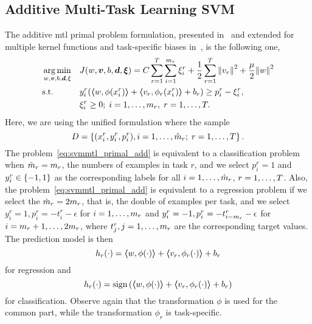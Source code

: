 \subsection{Additive Multi-Task Learning SVM}
The {additive} \acrshort{mtl} primal problem formulation, presented in~\cite{EvgeniouP04} 
and extended for multiple kernel functions and task-specific biases in~\cite{CaiC12}, is the following one,
\begin{equation}\label{eq:svmmtl_primal_add}
    \begin{aligned}
    & \argmin_{w, \fv{v}, b, \fv{d}, \xi}
    & & {J({w}, \fv{v}, b, \fv{d}, \fv{\xi}) = C \sum_{r= 1}^T \sum_{i=1}^{m_r} {\xi_{i}^r} + \frac{1}{2} \sum_{r= 1}^T{\norm{{v}_r}^2} + \frac{\mu}{2} {\norm{{w}}}^2} \\
    & \text{s.t.}
    & & y_{i}^r (\dotp{w}{\phi(x_{i}^r)} + \dotp{v_r}{\phi_r(x_{i}^r)} + b_r) \geq p_{i}^r - \xi_{i}^r ,  \\
    & & & \xi_{i}^r \geq 0; \;  i=1 , \dotsc , m_r, \;  r= 1,\dotsc, T  . \\
    \end{aligned}
\end{equation}
Here, we are using the unified formulation where the sample 
$$D = \left\{(x_i^r, y_i^r, p_i^r), i=1, \ldots, \hat{m}_r; \; r=1, \ldots, T\right\}. $$
The problem~\eqref{eq:svmmtl_primal_add} is equivalent to a classification problem when $\hat{m}_r = m_r$, the numbers of examples in task $r$, and we select $p_i^r=1$ and $y_i^r \in \left\{-1, 1\right\}$ as the corresponding labels for all $i=1, \ldots, \hat{m}_r$, $r=1, \ldots, T$.
Also, the problem~\eqref{eq:svmmtl_primal_add} is equivalent to a regression problem if we select the $\hat{m}_r = 2m_r$, that is, the double of examples per task, and we select $y_i^r=1, p_i^r=-t_{i}^r - \epsilon$ for $i=1, \ldots, m_r$ and $y_i^r=-1, p_i^r=-t_{i - m_r}^r - \epsilon$ for $i=m_r + 1, \ldots, 2m_r$, where $t_{j}^r, j=1, \ldots, m_r$ are the corresponding target values.
The prediction model is then 
\begin{equation}
    \nonumber
    h_r(\cdot) = \bm{\left\langle} w, \phi(\cdot) \bm{\right\rangle} + \bm{\left\langle} {v}_r, \phi_r(\cdot) \bm{\right\rangle} + b_r
\end{equation}
for regression and 
\begin{equation}
    \nonumber
    h_r(\cdot) = \operatorname{sign}{ \left(\bm{\left\langle} w, \phi(\cdot) \bm{\right\rangle} + \bm{\left\langle} {v}_r, \phi_r(\cdot) \bm{\right\rangle} + b_r \right)}
\end{equation}
for classification.
Observe again that the transformation $\phi$ is used for the common part, while the transformation $\phi_r$ is task-specific.

